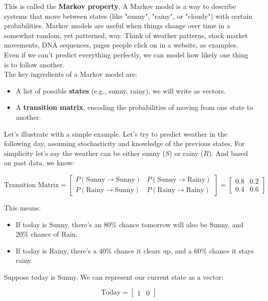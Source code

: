 \documentclass{book}
\begin{document}
This is called the \textbf{Markov property}. A Markov model is a way to describe systems that move between states (like "sunny", "rainy", or "cloudy") with certain probabilities. Markov models are useful when things change over time in a somewhat random, yet patterned, way. Think of weather patterns, stock market movements, DNA sequences, pages people click on in a website, as examples. Even if we can’t predict everything perfectly, we can model how likely one thing is to follow another.\\

The key ingredients of a Markov model are:
\begin{itemize}
  \item A list of possible \textbf{states} (e.g., sunny, rainy), we will write as vectors.
  \item A \textbf{transition matrix}, encoding the probabilities of moving from one state to another.
\end{itemize}

Let's illustrate with a simple example. Let's try to predict weather in the following day, assuming stochasticity and knowledge of the previous states. For simplicity let’s say the weather can be either sunny ($S$) or rainy ($R$). And based on past data, we know:

\[
\text{Transition Matrix} =
\begin{bmatrix}
P(\text{Sunny} \rightarrow \text{Sunny}) & P(\text{Sunny} \rightarrow \text{Rainy}) \\
P(\text{Rainy} \rightarrow \text{Sunny}) & P(\text{Rainy} \rightarrow \text{Rainy})
\end{bmatrix}
=
\begin{bmatrix}
0.8 & 0.2 \\
0.4 & 0.6
\end{bmatrix}
\]

This means:
\begin{itemize}
  \item If today is Sunny, there's an 80\% chance tomorrow will also be Sunny, and 20\% chance of Rain.
  \item If today is Rainy, there's a 40\% chance it clears up, and a 60\% chance it stays rainy.
\end{itemize}

Suppose today is Sunny. We can represent our current state as a vector:

\[
\text{Today} = \begin{bmatrix} 1 & 0 \end{bmatrix}
\]
\end{document}
